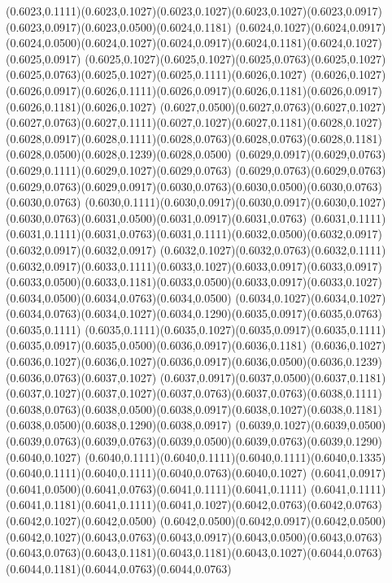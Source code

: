 (0.6023,0.1111)(0.6023,0.1027)(0.6023,0.1027)(0.6023,0.1027)(0.6023,0.0917)(0.6023,0.0917)(0.6023,0.0500)(0.6024,0.1181)
(0.6024,0.1027)(0.6024,0.0917)(0.6024,0.0500)(0.6024,0.1027)(0.6024,0.0917)(0.6024,0.1181)(0.6024,0.1027)(0.6025,0.0917)
(0.6025,0.1027)(0.6025,0.1027)(0.6025,0.0763)(0.6025,0.1027)(0.6025,0.0763)(0.6025,0.1027)(0.6025,0.1111)(0.6026,0.1027)
(0.6026,0.1027)(0.6026,0.0917)(0.6026,0.1111)(0.6026,0.0917)(0.6026,0.1181)(0.6026,0.0917)(0.6026,0.1181)(0.6026,0.1027)
(0.6027,0.0500)(0.6027,0.0763)(0.6027,0.1027)(0.6027,0.0763)(0.6027,0.1111)(0.6027,0.1027)(0.6027,0.1181)(0.6028,0.1027)
(0.6028,0.0917)(0.6028,0.1111)(0.6028,0.0763)(0.6028,0.0763)(0.6028,0.1181)(0.6028,0.0500)(0.6028,0.1239)(0.6028,0.0500)
(0.6029,0.0917)(0.6029,0.0763)(0.6029,0.1111)(0.6029,0.1027)(0.6029,0.0763)
\PST@Solid(0.6029,0.0763)(0.6029,0.0763)(0.6029,0.0763)(0.6029,0.0917)(0.6030,0.0763)(0.6030,0.0500)(0.6030,0.0763)(0.6030,0.0763)
(0.6030,0.1111)(0.6030,0.0917)(0.6030,0.0917)(0.6030,0.1027)(0.6030,0.0763)(0.6031,0.0500)(0.6031,0.0917)(0.6031,0.0763)
(0.6031,0.1111)(0.6031,0.1111)(0.6031,0.0763)(0.6031,0.1111)(0.6032,0.0500)(0.6032,0.0917)(0.6032,0.0917)(0.6032,0.0917)
(0.6032,0.1027)(0.6032,0.0763)(0.6032,0.1111)(0.6032,0.0917)(0.6033,0.1111)(0.6033,0.1027)(0.6033,0.0917)(0.6033,0.0917)
(0.6033,0.0500)(0.6033,0.1181)(0.6033,0.0500)(0.6033,0.0917)(0.6033,0.1027)(0.6034,0.0500)(0.6034,0.0763)(0.6034,0.0500)
(0.6034,0.1027)(0.6034,0.1027)(0.6034,0.0763)(0.6034,0.1027)(0.6034,0.1290)(0.6035,0.0917)(0.6035,0.0763)(0.6035,0.1111)
(0.6035,0.1111)(0.6035,0.1027)(0.6035,0.0917)(0.6035,0.1111)(0.6035,0.0917)(0.6035,0.0500)(0.6036,0.0917)(0.6036,0.1181)
(0.6036,0.1027)(0.6036,0.1027)(0.6036,0.1027)(0.6036,0.0917)(0.6036,0.0500)(0.6036,0.1239)(0.6036,0.0763)(0.6037,0.1027)
(0.6037,0.0917)(0.6037,0.0500)(0.6037,0.1181)(0.6037,0.1027)(0.6037,0.1027)(0.6037,0.0763)(0.6037,0.0763)(0.6038,0.1111)
(0.6038,0.0763)(0.6038,0.0500)(0.6038,0.0917)(0.6038,0.1027)(0.6038,0.1181)(0.6038,0.0500)(0.6038,0.1290)(0.6038,0.0917)
(0.6039,0.1027)(0.6039,0.0500)(0.6039,0.0763)(0.6039,0.0763)(0.6039,0.0500)(0.6039,0.0763)(0.6039,0.1290)(0.6040,0.1027)
(0.6040,0.1111)(0.6040,0.1111)(0.6040,0.1111)(0.6040,0.1335)(0.6040,0.1111)(0.6040,0.1111)(0.6040,0.0763)(0.6040,0.1027)
(0.6041,0.0917)(0.6041,0.0500)(0.6041,0.0763)(0.6041,0.1111)(0.6041,0.1111)
\PST@Solid(0.6041,0.1111)(0.6041,0.1181)(0.6041,0.1111)(0.6041,0.1027)(0.6042,0.0763)(0.6042,0.0763)(0.6042,0.1027)(0.6042,0.0500)
(0.6042,0.0500)(0.6042,0.0917)(0.6042,0.0500)(0.6042,0.1027)(0.6043,0.0763)(0.6043,0.0917)(0.6043,0.0500)(0.6043,0.0763)
(0.6043,0.0763)(0.6043,0.1181)(0.6043,0.1181)(0.6043,0.1027)(0.6044,0.0763)(0.6044,0.1181)(0.6044,0.0763)(0.6044,0.0763)
